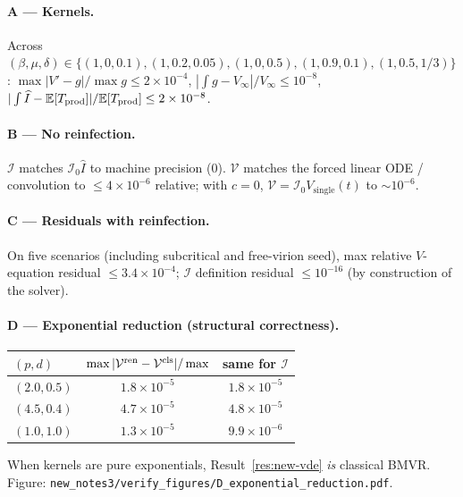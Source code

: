 \documentclass[11pt,a4paper]{article}
\newcommand{\E}{\mathbb{E}}
\newcommand{\Ihat}{\widehat{I}}
\newcommand{\Icell}{\mathcal{I}}
\newcommand{\Vfree}{\mathcal{V}}
\theoremstyle{plain}
\theoremstyle{definition}
\theoremstyle{remark}
\begin{document}
\paragraph{A --- Kernels.}
Across $(\beta,\mu,\delta)\in\{(1,0,0.1),(1,0.2,0.05),(1,0,0.5),(1,0.9,0.1),
(1,0.5,1/3)\}$:
$\max|V'-g|/\max g \le 2\times 10^{-4}$,
$|\int g-V_\infty|/V_\infty \le 10^{-8}$,
$|\int\Ihat-\E[T_{\rm prod}]|/\E[T_{\rm prod}] \le 2\times 10^{-8}$.

\paragraph{B --- No reinfection.}
$\Icell$ matches $\Icell_0\Ihat$ to machine precision ($0$).
$\Vfree$ matches the forced linear ODE / convolution to $\le 4\times 10^{-6}$
relative; with $c=0$, $\Vfree=\Icell_0 V_{\mathrm{single}}(t)$ to $\sim 10^{-6}$.

\paragraph{C --- Residuals with reinfection.}
On five scenarios (including subcritical and free-virion seed),
max relative $V$-equation residual $\le 3.4\times 10^{-4}$;
$\Icell$ definition residual $\le 10^{-16}$ (by construction of the solver).

\paragraph{D --- Exponential reduction (structural correctness).}
\begin{center}
\begin{tabular}{@{}lcc@{}}
\toprule
$(p,d)$ & $\max|\Vfree^{\rm ren}-\Vfree^{\rm cls}|/\max$ & same for $\Icell$ \\
\midrule
$(2.0,0.5)$ & $1.8\times 10^{-5}$ & $1.8\times 10^{-5}$ \\
$(4.5,0.4)$ & $4.7\times 10^{-5}$ & $4.8\times 10^{-5}$ \\
$(1.0,1.0)$ & $1.3\times 10^{-5}$ & $9.9\times 10^{-6}$ \\
\bottomrule
\end{tabular}
\end{center}
When kernels are pure exponentials, Result~\ref{res:new-vde} \emph{is} classical
BMVR. Figure: \texttt{new\_notes3/verify\_figures/D\_exponential\_reduction.pdf}.
\end{document}
